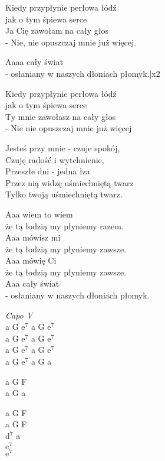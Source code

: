 \begin{textn}
    \chordfill
    Kiedy przypłynie perłowa łódź\\
    jak o tym śpiewa serce\\
    Ja Cię zawołam na cały głos\\
    - Nie, nie opuszczaj mnie już więcej.

    \vin Aaaa cały świat\\
    \vin - osłaniany w naszych dłoniach płomyk.|x2

    Kiedy przypłynie perłowa łódź\\
    jak o tym śpiewa serce\\
    Ty mnie zawołasz na cały głos\\
    - Nie nie opuszczaj mnie już więcej

    Jesteś przy mnie - czuje spokój,\\
    Czuję radość i wytchnienie,\\
    Przeszłe dni - jedna łza\\
    Przez nią widzę uśmiechniętą twarz\\
    Tylko twoją uśmiechniętą twarz.

    \vin Aaa wiem to wiem\\
    \vin że tą łodzią my płyniemy razem.\\
    \vin Aaa mówisz mi\\
    \vin że tą łodzią my płyniemy zawsze.\\
    \vin Aaa mówię Ci\\
    \vin że tą łodzią my płyniemy zawsze.\\
    \vin Aaa cały świat\\
    \vin - osłaniany w naszych dłoniach płomyk.
\end{textn}
\begin{chordw}
    \textit{Capo V}\\
    a G $\mathrm{e^{7}}$ a G $\mathrm{e^{7}}$\\
    a G $\mathrm{e^{7}}$ a G $\mathrm{e^{7}}$\\
    a G $\mathrm{e^{7}}$ a G $\mathrm{e^{7}}$\\
    a G $\mathrm{e^{7}}$ a G a

    a G F\\
    a G a

    \hfill\break
    \hfill\break
    \hfill\break
    \hfill\break
    \hfill\break
    a G F\\
    a G F\\
    $\mathrm{d^{7}}$ a\\
    $\mathrm{e^{7}}$\\
    $\mathrm{e^{7}}$

\end{chordw}
